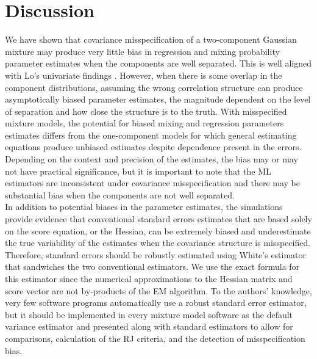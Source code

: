 \documentclass[10pt]{article}
\begin{document}
\section{Discussion}
We have shown that covariance misspecification of a two-component Gaussian mixture may produce very little bias in regression and mixing probability parameter estimates when the components are well separated. This is well aligned with Lo's univariate findings \cite{lo2011}. However, when there is some overlap in the component distributions, assuming the wrong correlation structure can produce asymptotically biased parameter estimates, the magnitude dependent on the level of separation and how close the structure is to the truth. With misspecified mixture models, the potential for biased mixing and regression parameters estimates differs from the one-component models for which general estimating equations \cite{liang1986} produce unbiased estimates despite dependence present in the errors. Depending on the context and precision of the estimates, the bias may or may not have practical significance, but it is important to note that the ML estimators are inconsistent under covariance misspecification and there may be substantial bias when the components are not well separated.\\

In addition to potential biases in the parameter estimates, the simulations provide evidence that conventional standard errors estimates that are based solely on the score equation, or the Hessian, can be extremely biased and underestimate the true variability of the estimates when the covariance structure is misspecified. Therefore, standard errors should be robustly estimated using White's estimator that sandwiches the two conventional estimators. We use the exact formula for this estimator since the numerical approximations to the Hessian matrix and score vector are not by-products of the EM algorithm. To the authors' knowledge, very few software programs automatically use a robust standard error estimator, but it should be implemented in every mixture model software as the default variance estimator and presented along with standard estimators to allow for comparisons, calculation of the RJ criteria, and the detection of misspecification bias. \\
\end{document}
